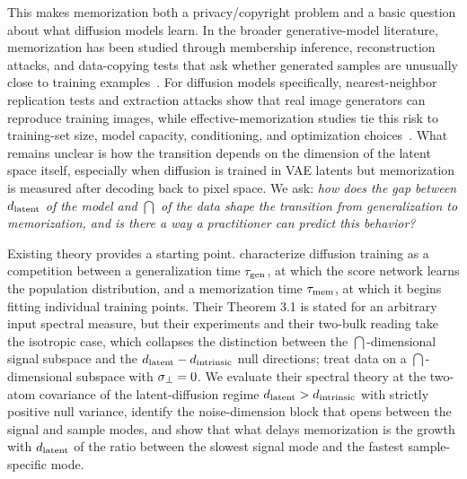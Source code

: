 This makes memorization both a privacy/copyright problem and a basic question about what diffusion models learn. In the broader generative-model literature, memorization has been studied through membership inference, reconstruction attacks, and data-copying tests that ask whether generated samples are unusually close to training examples~\citep{carlini2019secret,hayes2017logan,hilprecht2019reconstruction,meehan2020datacopying}. For diffusion models specifically, nearest-neighbor replication tests and extraction attacks show that real image generators can reproduce training images, while effective-memorization studies tie this risk to training-set size, model capacity, conditioning, and optimization choices~\citep{somepalli2023diffusion,carlini2023extracting,gu2023memorization}. What remains unclear is how the transition depends on the dimension of the latent space itself, especially when diffusion is trained in VAE latents but memorization is measured after decoding back to pixel space. We ask: \emph{how does the gap between $d_{\mathrm{latent}}$ of the model and $\dint$ of the data shape the transition from generalization to memorization, and is there a way a practitioner can predict this behavior?}

Existing theory provides a starting point. \citet{bonnaire2025} characterize diffusion training as a competition between a generalization time $\tau_{\mathrm{gen}}$, at which the score network learns the population distribution, and a memorization time $\tau_{\mathrm{mem}}$, at which it begins fitting individual training points. Their Theorem 3.1 is stated for an arbitrary input spectral measure, but their experiments and their two-bulk reading take the isotropic case, which collapses the distinction between the $\dint$-dimensional signal subspace and the $d_{\mathrm{latent}}-d_{\mathrm{intrinsic}}$ null directions; \citet{george2025dsm} treat data on a $\dint$-dimensional subspace with $\sigma_{\perp}=0$. We evaluate their spectral theory at the two-atom covariance of the latent-diffusion regime $d_{\mathrm{latent}}>d_{\mathrm{intrinsic}}$ with strictly positive null variance, identify the noise-dimension block that opens between the signal and sample modes, and show that what delays memorization is the growth with $d_{\mathrm{latent}}$ of the ratio between the slowest signal mode and the fastest sample-specific mode.


